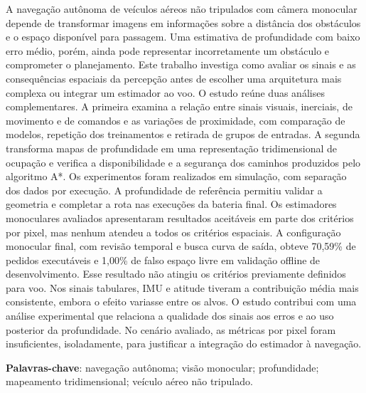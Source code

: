 
\setlength{\absparsep}{18pt}

\begin{resumo}
A navegação autônoma de veículos aéreos não tripulados com câmera monocular depende de transformar imagens em informações sobre a distância dos obstáculos e o espaço disponível para passagem. Uma estimativa de profundidade com baixo erro médio, porém, ainda pode representar incorretamente um obstáculo e comprometer o planejamento. Este trabalho investiga como avaliar os sinais e as consequências espaciais da percepção antes de escolher uma arquitetura mais complexa ou integrar um estimador ao voo. O estudo reúne duas análises complementares. A primeira examina a relação entre sinais visuais, inerciais, de movimento e de comandos e as variações de proximidade, com comparação de modelos, repetição dos treinamentos e retirada de grupos de entradas. A segunda transforma mapas de profundidade em uma representação tridimensional de ocupação e verifica a disponibilidade e a segurança dos caminhos produzidos pelo algoritmo A*. Os experimentos foram realizados em simulação, com separação dos dados por execução. A profundidade de referência permitiu validar a geometria e completar a rota nas execuções da bateria final. Os estimadores monoculares avaliados apresentaram resultados aceitáveis em parte dos critérios por pixel, mas nenhum atendeu a todos os critérios espaciais. A configuração monocular final, com revisão temporal e busca curva de saída, obteve 70,59\% de pedidos executáveis e 1,00\% de falso espaço livre em validação offline de desenvolvimento. Esse resultado não atingiu os critérios previamente definidos para voo. Nos sinais tabulares, IMU e atitude tiveram a contribuição média mais consistente, embora o efeito variasse entre os alvos. O estudo contribui com uma análise experimental que relaciona a qualidade dos sinais aos erros e ao uso posterior da profundidade. No cenário avaliado, as métricas por pixel foram insuficientes, isoladamente, para justificar a integração do estimador à navegação.

\vspace{\onelineskip}

\noindent
\textbf{Palavras-chave}: navegação autônoma; visão monocular; profundidade; mapeamento tridimensional; veículo aéreo não tripulado.
\end{resumo}

